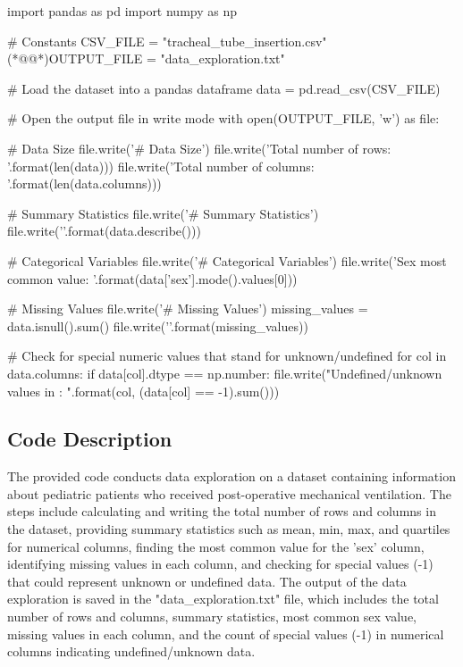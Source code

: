 \documentclass[11pt]{article}
\begin{document}
\begin{python}

import pandas as pd
import numpy as np

# Constants
CSV_FILE = "tracheal_tube_insertion.csv"
(*@@*)OUTPUT_FILE = "data_exploration.txt"

# Load the dataset into a pandas dataframe
data = pd.read_csv(CSV_FILE)

# Open the output file in write mode
with open(OUTPUT_FILE, 'w') as file:

    # Data Size
    file.write('# Data Size\n')
    file.write('Total number of rows: {}\n'.format(len(data)))
    file.write('Total number of columns: {}\n\n'.format(len(data.columns)))

    # Summary Statistics
    file.write('# Summary Statistics\n')
    file.write('{}\n\n'.format(data.describe()))

    # Categorical Variables
    file.write('# Categorical Variables\n')
    file.write('Sex most common value: {}\n\n'.format(data['sex'].mode().values[0]))

    # Missing Values
    file.write('# Missing Values\n')
    missing_values = data.isnull().sum()
    file.write('{}\n\n'.format(missing_values))
    
    # Check for special numeric values that stand for unknown/undefined
    for col in data.columns:
        if data[col].dtype == np.number:
            file.write("Undefined/unknown values in {}: {}\n".format(col, (data[col] == -1).sum()))

\end{python}

\subsection{Code Description}

The provided code conducts data exploration on a dataset containing information about pediatric patients who received post-operative mechanical ventilation. 
The steps include calculating and writing the total number of rows and columns in the dataset, providing summary statistics such as mean, min, max, and quartiles for numerical columns, finding the most common value for the 'sex' column, identifying missing values in each column, and checking for special values (-1) that could represent unknown or undefined data. 
The output of the data exploration is saved in the "data\_exploration.txt" file, which includes the total number of rows and columns, summary statistics, most common sex value, missing values in each column, and the count of special values (-1) in numerical columns indicating undefined/unknown data.
\end{document}
